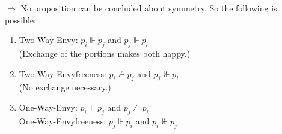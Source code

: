 $\Rightarrow$ No proposition can be concluded about symmetry. So the following is possible:
\begin{enumerate}
 \item Two-Way-Envy: $p_i\Vdash p_j$ and $p_j\Vdash p_i$\\(Exchange of the portions makes both happy.)
 \item Two-Way-Envyfreeness: $p_i\nVdash p_j$ and $p_j\nVdash p_i$\\(No exchange necessary.)
 \item One-Way-Envy: $p_i\Vdash p_j$ and $p_j\nVdash p_i$\\
       One-Way-Envyfreeness: $p_j\Vdash p_i$ and $p_i\nVdash p_j$
\end{enumerate}

